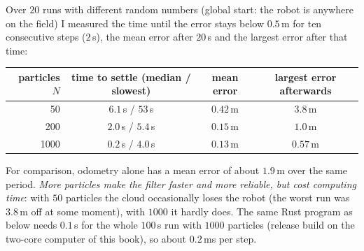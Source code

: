 \begin{center}
\end{center}

Over $20$ runs with different random numbers (global start: the robot is anywhere on the field) I measured the time until the error stays below $0.5$\,m for ten consecutive steps ($2$\,s), the mean error after $20$\,s and the largest error after that time:
\begin{center}\small
\begin{tabular}{r c c c}
\hline
particles $N$ & time to settle (median / slowest) & mean error & largest error afterwards\\\hline
50 & $6.1$\,s / $53$\,s & $0.42$\,m & $3.8$\,m\\
200 & $2.0$\,s / $5.4$\,s & $0.15$\,m & $1.0$\,m\\
1000 & $0.2$\,s / $4.0$\,s & $0.13$\,m & $0.57$\,m\\\hline
\end{tabular}
\end{center}
For comparison, odometry alone has a mean error of about $1.9$\,m over the same period. \emph{More particles make the filter faster and more reliable, but cost computing time}: with $50$ particles the cloud occasionally loses the robot (the worst run was $3.8$\,m off at some moment), with $1000$ it hardly does. The same Rust program as below needs $0.1$\,s for the whole $100$\,s run with $1000$ particles (release build on the two-core computer of this book), so about $0.2$\,ms per step.

